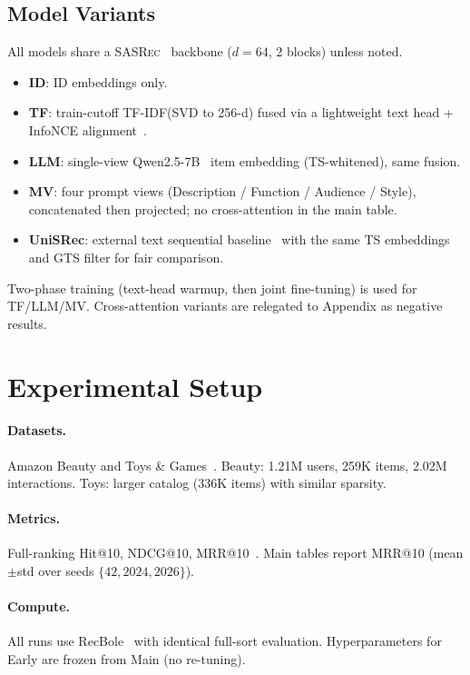 \documentclass[sigconf,natbib=true,anonymous]{acmart}
\newcommand{\tfidf}{\textsc{TF-IDF}\xspace}
\newcommand{\base}{\textsc{SASRec}\xspace}
\begin{document}
\subsection{Model Variants}
All models share a \base~\cite{kang2018sasrec} backbone ($d{=}64$, 2 blocks) unless noted.
\begin{itemize}[leftmargin=*,itemsep=1pt]
\item \textbf{ID}: ID embeddings only.
\item \textbf{TF}: train-cutoff \tfidf (SVD to 256-d) fused via a lightweight text head + InfoNCE alignment~\cite{oord2018cpc}.
\item \textbf{LLM}: single-view Qwen2.5-7B~\cite{qwen2024qwen25} item embedding (TS-whitened), same fusion.
\item \textbf{MV}: four prompt views (Description / Function / Audience / Style), concatenated then projected; no cross-attention in the main table.
\item \textbf{UniSRec}: external text sequential baseline~\cite{hou2022unisrec} with the same TS embeddings and GTS filter for fair comparison.
\end{itemize}
Two-phase training (text-head warmup, then joint fine-tuning) is used for TF/LLM/MV.
Cross-attention variants are relegated to Appendix as negative results.

\section{Experimental Setup}

\paragraph{Datasets.}
Amazon Beauty and Toys \& Games~\cite{mcauley2015amazon,ni2019amazon}.
Beauty: 1.21M users, 259K items, 2.02M interactions.
Toys: larger catalog (336K items) with similar sparsity.

\paragraph{Metrics.}
Full-ranking Hit@10, NDCG@10, MRR@10~\cite{krichene2020sampledmetrics}.
Main tables report MRR@10 (mean$\pm$std over seeds $\{42,2024,2026\}$).

\paragraph{Compute.}
All runs use RecBole~\cite{zhao2021recbole} with identical full-sort evaluation.
Hyperparameters for Early are frozen from Main (no re-tuning).
\end{document}

